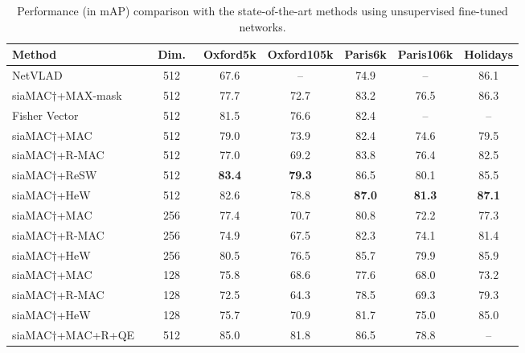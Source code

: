 \documentclass[journal]{IEEEtran}
\begin{document}
\begin{table*}[t]
\begin{center}
\caption{Performance (in mAP) comparison with the state-of-the-art methods using unsupervised fine-tuned networks. }\label{comparison_with_fine_tuning}
\begin{tabular}{|l|c| c c c c c|}
  \hline
  Method                                 &~Dim.~  &Oxford5k  &Oxford105k  &Paris6k  &Paris106k &Holidays \\
  \hline
  \hline
  NetVLAD~\cite{arandjelovic2016netvlad} &512 &67.6  &--          &74.9     &--        &86.1\\
  siaMAC$\dagger$+MAX-mask~\cite{hoang2017selective}&512   &77.7      &72.7        &83.2     &76.5      &86.3\\
  Fisher Vector~\cite{ong2017siamese}               &512   &81.5  &76.6      &82.4        &--       &--   \\
  siaMAC$\dagger$+MAC~\cite{radenovic2016cnn}     &512   &79.0      &73.9        &82.4     &74.6      &79.5\\
  siaMAC$\dagger$+R-MAC~\cite{radenovic2016cnn}     &512   &77.0      &69.2        &83.8     &76.4      &82.5\\
  siaMAC$\dagger$+ReSW~\cite{pang2018building}     &512   &\textbf{83.4}      &\textbf{79.3}        &86.5     &80.1      &85.5\\
  siaMAC$\dagger$+HeW                              &512   &82.6 &78.8 &\textbf{87.0} &\textbf{81.3} &\textbf{87.1}    \\
  \hline
  siaMAC$\dagger$+MAC~\cite{radenovic2016cnn}       &256   &77.4      &70.7       &80.8     &72.2      &77.3\\
  siaMAC$\dagger$+R-MAC~\cite{radenovic2016cnn}     &256   &74.9      &67.5       &82.3     &74.1      &81.4\\
  siaMAC$\dagger$+HeW                              &256    &80.5      &76.5       &85.7     &79.9      &85.9\\
  \hline
  siaMAC$\dagger$+MAC~\cite{radenovic2016cnn}       &128   &75.8      &68.6        &77.6     &68.0      &73.2\\
  siaMAC$\dagger$+R-MAC~\cite{radenovic2016cnn}     &128   &72.5      &64.3        &78.5     &69.3      &79.3\\
  siaMAC$\dagger$+HeW                              &128    &75.7      &70.9        &81.7     &75.0      &85.0\\
  \hline
  \hline
  siaMAC$\dagger$+MAC+R+QE~\cite{radenovic2016cnn}       &512   &85.0  &81.8   &86.5    &78.8    &--\\

\end{tabular}
\end{center}
\end{table*}
\end{document}

